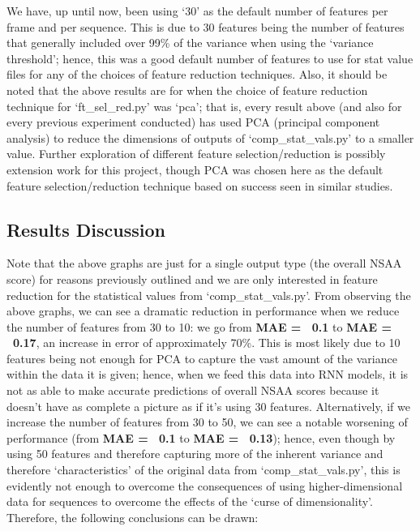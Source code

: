 \documentclass[12pt,twoside]{report}
\begin{document}
\quad We have, up until now, been using ‘30’ as the default number of features per frame and per sequence. This is due to 30 features being the number of features that generally included over 99\% of the variance when using the ‘variance threshold’; hence, this was a good default number of features to use for stat value files for any of the choices of feature reduction techniques. Also, it should be noted that the above results are for when the choice of feature reduction technique for ‘ft\_sel\_red.py’ was ‘pca’; that is, every result above (and also for every previous experiment conducted) has used PCA (principal component analysis) to reduce the dimensions of outputs of ‘comp\_stat\_vals.py’ to a smaller value. Further exploration of different feature selection/reduction is possibly extension work for this project, though PCA was chosen here as the default feature selection/reduction technique based on success seen in similar studies.

\subsection{Results Discussion}

\quad Note that the above graphs are just for a single output type (the overall NSAA score) for reasons previously outlined and we are only interested in feature reduction for the statistical values from ‘comp\_stat\_vals.py’. From observing the above graphs, we can see a dramatic reduction in performance when we reduce the number of features from 30 to 10: we go from \textbf{MAE = ~0.1} to \textbf{MAE = ~0.17}, an increase in error of approximately 70\%. This is most likely due to 10 features being not enough for PCA to capture the vast amount of the variance within the data it is given; hence, when we feed this data into RNN models, it is not as able to make accurate predictions of overall NSAA scores because it doesn’t have as complete a picture as if it’s using 30 features. Alternatively, if we increase the number of features from 30 to 50, we can see a notable worsening of performance (from \textbf{MAE = ~0.1} to \textbf{MAE = ~0.13}); hence, even though by using 50 features and therefore capturing more of the inherent variance and therefore ‘characteristics’ of the original data from ‘comp\_stat\_vals.py’, this is evidently not enough to overcome the consequences of using higher-dimensional data for sequences to overcome the effects of the ‘curse of dimensionality’. Therefore, the following conclusions can be drawn:
\end{document}
